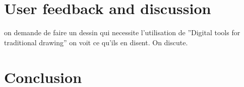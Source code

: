 \documentclass{sigchi}
\begin{document}
\section{User feedback and discussion}

on demande de faire un dessin qui necessite l'utilisation de ''Digital tools for traditional drawing''
on voit ce qu'ils en disent. On discute.


\section{Conclusion}

 
\balance



\end{document}
